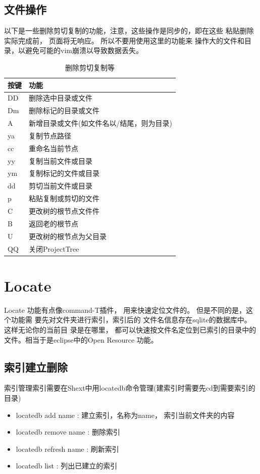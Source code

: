 \documentclass[oneside,openany]{book}
\begin{document}
  \subsection{文件操作}
  以下是一些删除剪切复制的功能，注意，这些操作是同步的，即在这些
粘贴删除实际完成前， 页面将无响应。 所以不要用使用这里的功能来
操作大的文件和目录，以避免可能的vim崩溃以导致数据丢失。
  \begin{table}[H]
  \caption{删除剪切复制等}
  \centering
      \begin{tabular}{p{40pt}p{220pt}}
        \toprule
        按键& 功能\\
        \midrule
          DD    &删除选中目录或文件\\
          Dm    &删除标记的目录或文件\\
          A     &新增目录或文件(如文件名以/结尾，则为目录)\\
          ya    &复制节点路径\\
          cc    &重命名当前节点\\
          yy    &复制当前文件或目录\\
          ym    &复制标记的文件或目录\\
          dd    &剪切当前文件或目录\\
          p     &粘贴复制或剪切的文件\\
          C     &更改树的根节点文件件\\
          B     &返回老的根节点\\
          U     &更改树的根节点为父目录\\
          QQ    &关闭ProjectTree\\
        \bottomrule
      \end{tabular}
  \end{table}

\section{Locate}

    Locate 功能有点像command-T插件， 用来快速定位文件的。 但是不同的是，这个功能需
要先对文件夹进行索引，索引后的 文件名信息存在sqlite的数据库中。 这样无论你的当前目
录是在哪里， 都可以快速按文件名定位到已索引的目录中的文件。相当于是eclipse中的Open Resource
功能。

\subsection{索引建立删除}
  索引管理索引需要在Shext中用locatedb命令管理(建索引时需要先cd到需要索引的目录) 
  \begin{itemize}
      \item locatedb add name : 建立索引，名称为name， 索引当前文件夹的内容
      \item locatedb remove name : 删除索引
      \item locatedb refresh name : 刷新索引
      \item locatedb list : 列出已建立的索引 
  \end{itemize}
\end{document}
